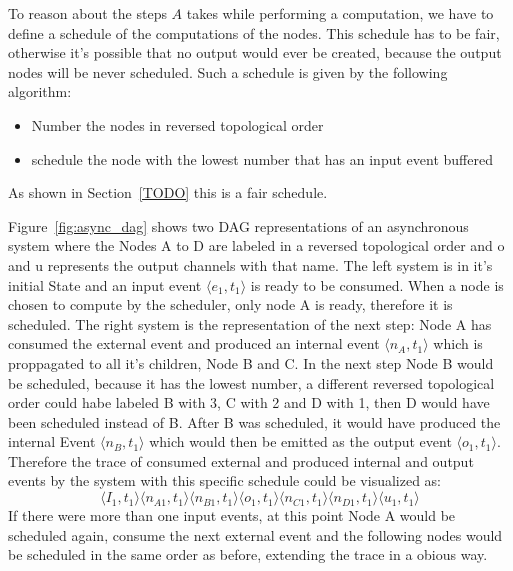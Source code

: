 To reason about the steps $A$ takes while performing a computation, we have to define a schedule of the computations of the nodes.
This schedule has to be fair, otherwise it's possible that no output would ever be created, because the output nodes will be never scheduled.
Such a schedule is given by the following algorithm:

\begin{itemize}
  \item Number the nodes in reversed topological order
  \item schedule the node with the lowest number that has an input event buffered
\end{itemize}

As shown in Section~\ref{TODO} this is a fair schedule.

Figure~\ref{fig:async_dag} shows two DAG representations of an asynchronous system where the Nodes A to D are labeled
in a reversed topological order and o and u represents the output channels with that name.
The left system is in it's initial State and an input event \(\langle e_1,t_1\rangle\) is ready to be consumed.
When a node is chosen to compute by the scheduler, only node A is ready, therefore it is scheduled.
The right system is the representation of the next step: Node A has consumed the external event and produced an internal event
\(\langle n_A,t_1\rangle\) which is proppagated to all it's children, Node B and C.
In the next step Node B would be scheduled, because it has the lowest number, a different reversed topological order could habe
labeled B with 3, C with 2 and D with 1, then D would have been scheduled instead of B.
After B was scheduled, it would have produced the internal Event \(\langle n_B,t_1\rangle\) which would then be emitted as the output event
\(\langle o_1,t_1 \rangle\).
Therefore the trace of consumed external and produced internal and output events by the system with this specific schedule could be visualized as:
\[
  \langle I_1,t_1 \rangle \langle n_{A1},t_1 \rangle \langle n_{B1},t_1 \rangle \langle o_1,t_1 \rangle \langle n_{C1},t_1 \rangle \langle n_{D1},t_1 \rangle \langle u_1,t_1 \rangle
\]
If there were more than one input events, at this point Node A would be scheduled again, consume the next external event and the following nodes would be scheduled in the same order as before,
extending the trace in a obious way.

